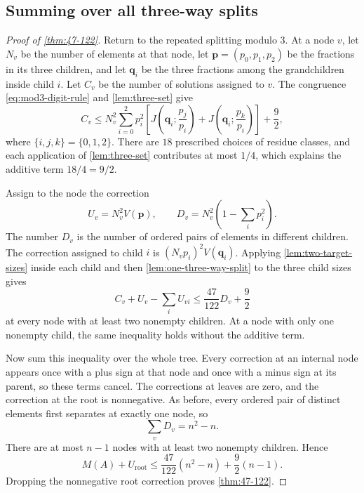\documentclass[11pt]{article}
\numberwithin{equation}{section}
\theoremstyle{remark}
\begin{document}
\subsection{Summing over all three-way splits}

\begin{proof}[Proof of \cref{thm:47-122}]
Return to the repeated splitting modulo $3$.  At a node $v$, let $N_v$ be
the number of elements at that node, let
$\mathbf p=(p_0,p_1,p_2)$ be the fractions in its three children, and let
$\mathbf q_i$ be
the three fractions among the grandchildren inside child $i$.  Let $C_v$
be the number of solutions assigned to $v$.  The congruence
\eqref{eq:mod3-digit-rule} and \cref{lem:three-set} give
\begin{equation}\label{eq:node-count-relative}
 C_v
 \le N_v^2\sum_{i=0}^2p_i^2
 \left[
 J\left(\mathbf q_i;\frac{p_j}{p_i}\right)
 +J\left(\mathbf q_i;\frac{p_k}{p_i}\right)
 \right]+\frac92,
\end{equation}
where $\{i,j,k\}=\{0,1,2\}$.  There are $18$ prescribed choices of
residue classes, and each application of \cref{lem:three-set} contributes
at most $1/4$, which explains the additive term $18/4=9/2$.

Assign to the node the correction
\begin{equation}\label{eq:def-U-D}
 U_v=N_v^2V(\mathbf p),
 \qquad
 D_v=N_v^2\left(1-\sum_i p_i^2\right).
\end{equation}
The number $D_v$ is the number of ordered pairs of elements in different
children.  The correction assigned to child $i$ is
$(N_vp_i)^2V(\mathbf q_i)$.  Applying \cref{lem:two-target-sizes} inside each child
and then \cref{lem:one-three-way-split} to the three child sizes gives
\begin{equation}\label{eq:node-correction}
 C_v+U_v-\sum_iU_{vi}
 \le \frac{47}{122}D_v+\frac92
\end{equation}
at every node with at least two nonempty children.  At a node with only one
nonempty child, the same inequality holds without the additive term.

Now sum this inequality over the whole tree.  Every correction at an
internal node appears once with a plus sign at that node and once with a
minus sign at its parent, so these terms cancel.  The corrections at leaves
are zero, and the correction at the root is nonnegative.  As before, every
ordered pair of distinct elements first separates at exactly one node, so
\[
 \sum_vD_v=n^2-n.
\]
There are at most $n-1$ nodes with at least two nonempty children.  Hence
\[
 M(A)+U_{\mathrm{root}}
 \le \frac{47}{122}(n^2-n)+\frac92(n-1).
\]
Dropping the nonnegative root correction proves \cref{thm:47-122}.
\end{proof}
\end{document}
